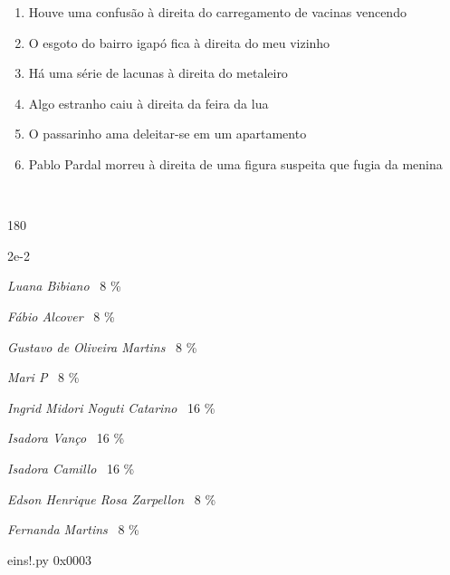\documentclass[12pt]{article}
\begin{document}
	\begin{enumerate}


\vfill \item
Houve uma confusão	%
à direita
do carregamento de vacinas vencendo	%

\vfill \item
O esgoto do bairro igapó fica	%
à direita
do meu vizinho	%

\vfill \item
Há uma série de lacunas	%
à direita
do metaleiro	%

\vfill \item
Algo estranho caiu	%
à direita
da feira da lua	%

\vfill \item
O passarinho ama deleitar-se	%
em um apartamento	%

\vfill \item
Pablo Pardal morreu	%
à direita
de uma figura suspeita que fugia da menina	%
	\end{enumerate}
\pagebreak
			\ttfamily %

	\ 
	\vfill
	\begin{turn}{180}	
		\begin{minipage}{\textwidth}
			\centering
			{\Huge 2e-2}
		  
			\hfill
		  
			

\textit{Luana Bibiano}
	\ 8 \%

\textit{Fábio Alcover}
	\ 8 \%

\textit{Gustavo de Oliveira Martins}
	\ 8 \%

\textit{Mari P}
	\ 8 \%

\textit{Ingrid Midori Noguti Catarino}
	\ 16 \%

\textit{Isadora Vanço}
	\ 16 \%

\textit{Isadora Camillo}
	\ 16 \%

\textit{Edson Henrique Rosa Zarpellon}
	\ 8 \%

\textit{Fernanda Martins}
	\ 8 \%

\bigskip

eins!.py
0x0003


		\end{minipage}	
	\end{turn}
	\vfill
	\
\end{document}

